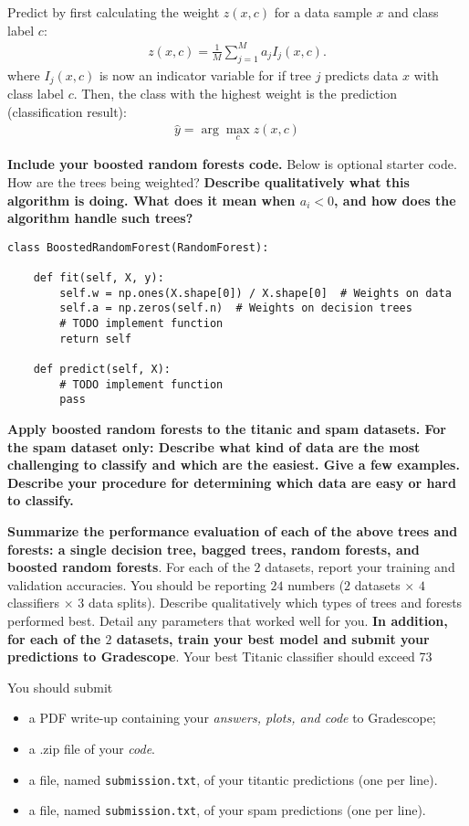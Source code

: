 \begin{Parts}
Predict by first calculating the weight $z(x, c)$ for a data sample $x$ and class label $c$:
\begin{align*}
z(x, c) = \frac{1}{M} \sum_{j=1}^M a_j I_{j}(x, c).
\end{align*}
where $I_j(x,c)$ is now an indicator variable for if tree $j$ predicts data $x$ with class label $c$.
Then, the class with the highest weight is the prediction (classification result):
\begin{align*}
\hat{y} = \arg \max_c z(x, c)
\end{align*}

\textbf{Include your boosted random forests code.} Below is optional starter code. How are the trees being weighted? \textbf{Describe qualitatively what this algorithm is doing. What does it mean when $a_i < 0$, and how does the algorithm handle such trees?} 

\begin{verbatim}
class BoostedRandomForest(RandomForest):

    def fit(self, X, y):
        self.w = np.ones(X.shape[0]) / X.shape[0]  # Weights on data
        self.a = np.zeros(self.n)  # Weights on decision trees
        # TODO implement function
        return self

    def predict(self, X):
        # TODO implement function
        pass
\end{verbatim}




\Part \textbf{Apply boosted random forests to the titanic and spam datasets. For the spam dataset only: Describe what kind of data are the most challenging to classify and which are the easiest. Give a few examples. Describe your procedure for determining which data are easy or hard to classify.}



\Part \textbf{Summarize the performance evaluation of each of the above trees and forests: a single decision tree, bagged trees, random forests, and boosted random forests}. For each of the $2$ datasets, report your training and validation accuracies. You should be reporting $24$ numbers ($2$ datasets $\times$ $4$ classifiers $\times$ $3$ data splits). Describe qualitatively which types of trees and forests performed best. Detail any parameters that worked well for you. \textbf{In addition, for each of the $2$ datasets, train your best model and submit your predictions to Gradescope}. Your best Titanic classifier should exceed 73\




\Part You should submit
\begin{itemize}
	\item a PDF write-up containing your \textit{answers, plots, and code} to Gradescope;
	\item a .zip file of your \textit{code}.
	\item a file, named \texttt{submission.txt}, of your titantic predictions (one per line).
	\item a file, named \texttt{submission.txt}, of your spam predictions (one per line).
\end{itemize}

\end{Parts}
